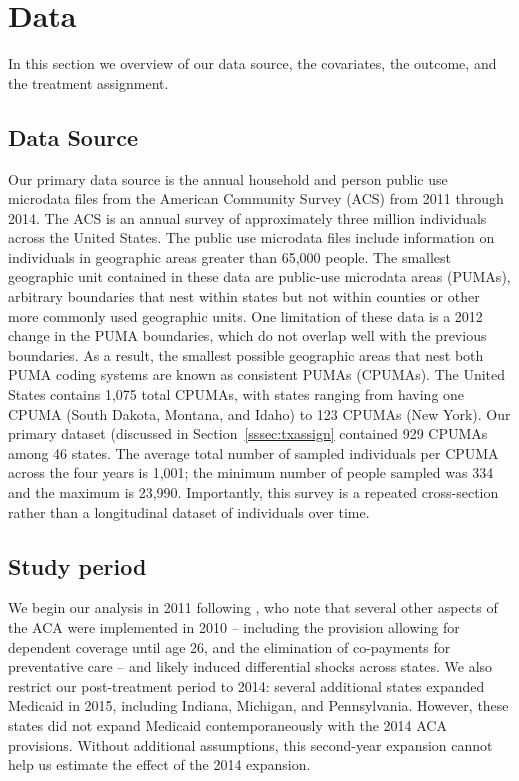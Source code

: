\documentclass[aoas]{imsart}
\theoremstyle{plain}
\theoremstyle{remark}
\begin{document}
\section{Data}

In this section we overview of our data source, the covariates, the outcome, and the treatment assignment.

\subsection{Data Source}

Our primary data source is the annual household and person public use microdata files from the American Community Survey (ACS) from 2011 through 2014. The ACS is an annual survey of approximately three million individuals across the United States. The public use microdata files include information on individuals in geographic areas greater than 65,000 people. The smallest geographic unit contained in these data are public-use microdata areas (PUMAs), arbitrary boundaries that nest within states but not within counties or other more commonly used geographic units. One limitation of these data is a 2012 change in the PUMA boundaries, which do not overlap well with the previous boundaries. As a result, the smallest possible geographic areas that nest both PUMA coding systems are known as consistent PUMAs (CPUMAs). The United States contains 1,075 total CPUMAs, with states ranging from having one CPUMA (South Dakota, Montana, and Idaho) to 123 CPUMAs (New York). Our primary dataset (discussed in Section~\ref{sssec:txassign} contained 929 CPUMAs among 46 states. The average total number of sampled individuals per CPUMA across the four years is 1,001; the minimum number of people sampled was 334 and the maximum is 23,990. Importantly, this survey is a repeated cross-section rather than a longitudinal dataset of individuals over time.

\subsection{Study period}

We begin our analysis in 2011 following \cite{courtemanche2017early}, who note that several other aspects of the ACA were implemented in 2010 -- including the provision allowing for dependent coverage until age 26, and the elimination of co-payments for preventative care -- and likely induced differential shocks across states. We also restrict our post-treatment period to 2014: several additional states expanded Medicaid in 2015, including Indiana, Michigan, and Pennsylvania. However, these states did not expand Medicaid contemporaneously with the 2014 ACA provisions. Without additional assumptions, this second-year expansion cannot help us estimate the effect of the 2014 expansion. 
\end{document}

